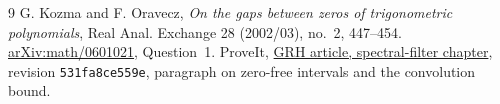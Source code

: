 \documentclass[11pt]{article}
\begin{document}
\begin{thebibliography}{9}
G. Kozma and F. Oravecz,
\emph{On the gaps between zeros of trigonometric polynomials},
Real Anal. Exchange 28 (2002/03), no.~2, 447--454.
\href{https://arxiv.org/abs/math/0601021}{arXiv:math/0601021},
Question~1.
ProveIt,
\href{https://github.com/VladimirReshetnikov/ProveIt/blob/531fa8ce559ed7a34b1a962bd325472171741000/Analysis/GeneralizedRiemannHypothesis/Article/sections/fil.tex}{GRH article, spectral-filter chapter},
revision \texttt{531fa8ce559e}, paragraph on zero-free intervals
and the convolution bound.
\end{thebibliography}
\end{document}
